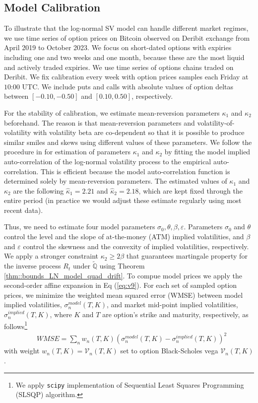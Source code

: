 \documentclass[11pt,a4paper] {article}
\begin{document}
\subsection{Model Calibration}\label{sec:kappa2calib}

To illustrate that the log-normal SV model can handle different market regimes, we use  time series of option prices on Bitcoin observed on Deribit exchange from April 2019 to October 2023. We focus on short-dated options with expiries including one and two weeks and one month, because these are the most liquid and actively traded expiries. We use time series of options chains  traded on Deribit. We fix calibration every week with option prices samples each Friday at $10$:$00$ UTC. We include puts and calls with absolute values of option deltas between $[-0.10, -0.50]$ and $[0.10, 0.50]$, respectively.


For the stability of calibration, we estimate mean-reversion parameters $\kappa_{1}$ and $\kappa_{2}$ beforehand. The reason is that mean-reversion parameters and volatility-of-volatility with volatility beta are co-dependent so that it is possible to produce similar smiles and skews using different values of these parameters. We follow the procedure in \cite{SeppRakhmonov2023} for estimation of parameters $\kappa_{1}$ and $\kappa_{2}$ by fitting the model implied auto-correlation of the log-normal volatility process to the empirical auto-correlation. This is efficient because the model auto-correlation function is determined solely by mean-reversion parameters. The estimated values of $\kappa_{1}$ and $\kappa_{2}$ are the following $\hat{\kappa}_{1}=2.21$ and $\hat{\kappa}_{2}=2.18$, which are kept fixed through the entire period (in practice we would adjust these estimate regularly using most recent data).

Thus, we need to estimate four model parameters $\sigma_{0}, \theta, \beta, \varepsilon$. Parameters $\sigma_{0}$ and $\theta$ control the level and the slope of at-the-money (ATM) implied volatilities, and $\beta$ and $\varepsilon$ control the skewness and the convexity of implied volatilities, respectively. We apply a stronger constraint $\kappa_2\ge 2\beta$ that guarantees martingale property for the inverse process $R_t$ under $\tilde{\mathbb{Q}}$ using Theorem \ref{thm::bounds_LN_model_quad_drift}. To compue model prices we apply the second-order affine expansion in Eq (\ref{eq:v9}). For each set of sampled option prices, we minimize the weighted mean squared error (WMSE) between model implied volatilities, $\sigma^{model}_{n}(T,K)$, and market mid-point implied volatilities, $\sigma^{implied}_{n}(T,K)$, where $K$ and $T$ are option's strike and maturity, respectively, as follows\footnote{We apply {\tt scipy} implementation of Sequential Least Squares Programming (SLSQP) algorithm.} 
\begin{equation} \label{eq:mf1}
\begin{split}
& WMSE = \sum_{n} w_{n}(T,K)\left( \sigma^{model}_{n}(T,K) - \sigma^{implied}_{n}(T,K)  \right) ^{2}
\end{split}
\end{equation}
with weight $w_{n}(T,K)=\mathcal{V}_{n}(T,K)$ set to option Black-Scholes vega $\mathcal{V}_{n}(T,K)$.
\end{document}
